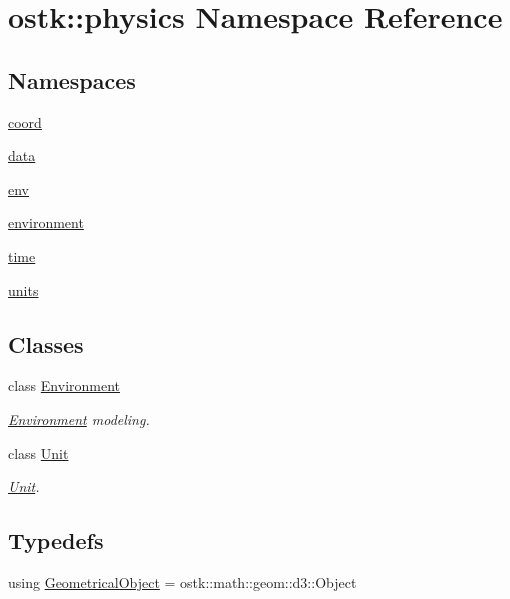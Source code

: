 \hypertarget{namespaceostk_1_1physics}{}\section{ostk\+:\+:physics Namespace Reference}
\label{namespaceostk_1_1physics}
\subsection*{Namespaces}
\begin{DoxyCompactItemize}
\item 
 \hyperlink{namespaceostk_1_1physics_1_1coord}{coord}
\item 
 \hyperlink{namespaceostk_1_1physics_1_1data}{data}
\item 
 \hyperlink{namespaceostk_1_1physics_1_1env}{env}
\item 
 \hyperlink{namespaceostk_1_1physics_1_1environment}{environment}
\item 
 \hyperlink{namespaceostk_1_1physics_1_1time}{time}
\item 
 \hyperlink{namespaceostk_1_1physics_1_1units}{units}
\end{DoxyCompactItemize}
\subsection*{Classes}
\begin{DoxyCompactItemize}
\item 
class \hyperlink{classostk_1_1physics_1_1_environment}{Environment}
\begin{DoxyCompactList}\small\item\em \hyperlink{classostk_1_1physics_1_1_environment}{Environment} modeling. \end{DoxyCompactList}\item 
class \hyperlink{classostk_1_1physics_1_1_unit}{Unit}
\begin{DoxyCompactList}\small\item\em \hyperlink{classostk_1_1physics_1_1_unit}{Unit}. \end{DoxyCompactList}\end{DoxyCompactItemize}
\subsection*{Typedefs}
\begin{DoxyCompactItemize}
\item 
using \hyperlink{namespaceostk_1_1physics_a4d67ab79697543f92030bbe07d5daac8}{Geometrical\+Object} = ostk\+::math\+::geom\+::d3\+::\+Object
\end{DoxyCompactItemize}
